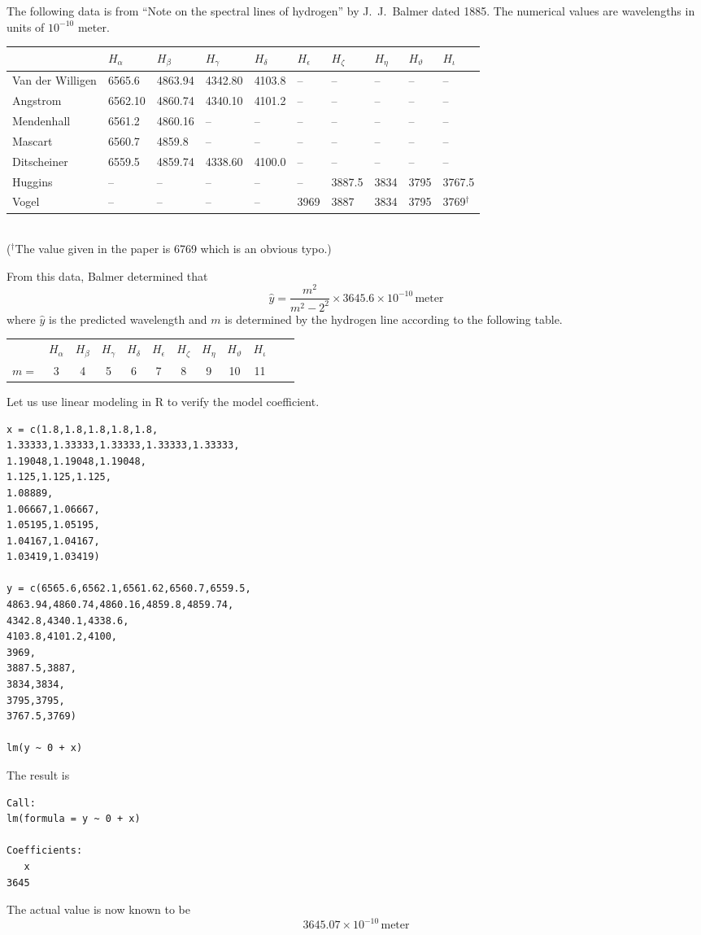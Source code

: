 \documentclass[12pt]{article}
\begin{document}
\noindent
The following data is from
``Note on the spectral lines of hydrogen''
by J.~J.~Balmer dated 1885.
The numerical values are wavelengths in units of $10^{-10}$ meter.

\begin{center}
\footnotesize
\begin{tabular}{|l|l|l|l|l|l|l|l|l|l|}
\hline
 & $H_\alpha$ & $H_\beta$ & $H_\gamma$ & $H_\delta$ & $H_\epsilon$ &
$H_\zeta$ & $H_\eta$ & $H_\vartheta$ & $H_\iota$
\\
\hline
Van der Willigen & 6565.6 & 4863.94 & 4342.80 & 4103.8 & -- & -- & -- & -- & --
\\
Angstrom & 6562.10 & 4860.74 & 4340.10 & 4101.2 & -- & -- & -- & -- & --
\\
Mendenhall & 6561.2 & 4860.16 & -- & -- & -- & -- & -- & -- & --
\\
Mascart & 6560.7 & 4859.8 & -- & -- & -- & -- & -- & -- & --
\\
Ditscheiner & 6559.5 & 4859.74 & 4338.60 & 4100.0 & -- & -- & -- & -- & --
\\
Huggins & -- & -- & -- & -- & -- & 3887.5 & 3834 & 3795 & 3767.5
\\
Vogel & -- & -- & -- & -- & 3969 & 3887 & 3834 & 3795 & 3769${}^\dag$
\\
\hline
\end{tabular}
\\
{\footnotesize(${}^\dag$The value given in the paper is 6769 which is an obvious typo.)}
\end{center}

\noindent
From this data, Balmer determined that
\begin{equation*}
\hat{y}=\frac{m^2}{m^2-2^2}\times3645.6\times10^{-10}\,\text{meter}
\end{equation*}
where $\hat{y}$ is the predicted wavelength and $m$ is determined by the hydrogen line
according to the following table.
\begin{center}
\begin{tabular}{cccccccccccc}
& $H_\alpha$ & $H_\beta$ & $H_\gamma$ & $H_\delta$ & $H_\epsilon$ &
$H_\zeta$ & $H_\eta$ & $H_\vartheta$ & $H_\iota$
\\
$m=$ & 3 & 4 & 5 & 6 & 7 & 8 & 9 & 10 & 11
\end{tabular}
\end{center}

\noindent
Let us use linear modeling in R to verify the model coefficient.
{\footnotesize\color{blue}
\begin{verbatim}
x = c(1.8,1.8,1.8,1.8,1.8,
1.33333,1.33333,1.33333,1.33333,1.33333,
1.19048,1.19048,1.19048,
1.125,1.125,1.125,
1.08889,
1.06667,1.06667,
1.05195,1.05195,
1.04167,1.04167,
1.03419,1.03419)

y = c(6565.6,6562.1,6561.62,6560.7,6559.5,
4863.94,4860.74,4860.16,4859.8,4859.74,
4342.8,4340.1,4338.6,
4103.8,4101.2,4100,
3969,
3887.5,3887,
3834,3834,
3795,3795,
3767.5,3769)

lm(y ~ 0 + x)
\end{verbatim}
}

\bigskip
\noindent
The result is
{\footnotesize
\begin{verbatim}
Call:
lm(formula = y ~ 0 + x)

Coefficients:
   x  
3645
\end{verbatim}
}

\noindent
The actual value is now known to be
\begin{equation*}
3645.07\times10^{-10}\,\text{meter}
\end{equation*}
\end{document}
